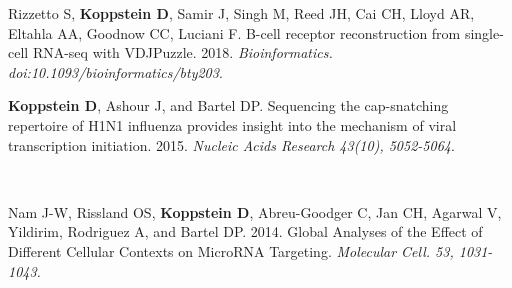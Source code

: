 \documentclass[10pt,a4paper]{article}
\begin{document}
\sloppy  %


{\centering
{}\par
}
\nobreakvspace{0.1em}  %

\vspace{0.05in}

\begin{enumerate}
{\item Rizzetto S, \textbf{Koppstein D}, Samir J, Singh M, Reed JH, Cai CH, Lloyd AR, Eltahla AA, Goodnow CC, Luciani F. B-cell receptor reconstruction from single-cell RNA-seq with VDJPuzzle. 2018. \textit{Bioinformatics. doi:10.1093/bioinformatics/bty203}. \vspace{0.5em} \\
{\item \textbf{Koppstein D}, Ashour J, and Bartel DP. Sequencing the cap-snatching repertoire of H1N1
influenza provides insight into the mechanism of viral transcription initiation. 2015. \textit{Nucleic Acids Research 43(10), 5052-5064}.} \vspace{0.5em} \\
{\item Nam J-W, Rissland OS, \textbf{Koppstein D}, Abreu-Goodger C, Jan CH, Agarwal V, Yildirim, Rodriguez A, and Bartel DP. 2014. Global Analyses of the Effect of Different Cellular Contexts on MicroRNA Targeting. \textit{Molecular Cell. 53, 1031-1043.}} \vspace{0.5em}} \\
\end{enumerate}

\spacedhrule{-0.4em}{-0.5em}  %
\end{document}
